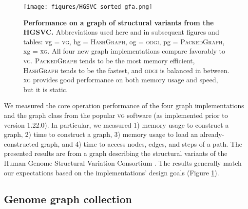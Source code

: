 \documentclass{bioinfo}
\begin{document}
\begin{figure}
	\begin{center}
		\texttt{[image: figures/HGSVC\_sorted\_gfa.png]}
	\end{center}
	\caption{{\label{fig:hgsvc}
        \textbf{Performance on a graph of structural variants from the HGSVC.}
        Abbreviations used here and in subsequent figures and tables: vg = \textsc{vg}, hg = \textsc{HashGraph}, og = \textsc{odgi}, pg = \textsc{PackedGraph}, xg = \textsc{xg}.
        All four new graph implementations compare favorably to \textsc{vg}.
        \textsc{PackedGraph} tends to be the most memory efficient, \textsc{HashGraph} tends to be the fastest, and \textsc{odgi} is balanced in between.
        \textsc{xg} provides good performance on both memory usage and speed, but it is static.
        }
      }
\end{figure}

We measured the core operation performance of the four graph implementations and the graph class from the popular \textsc{vg} software (as implemented prior to version 1.22.0).
In particular, we measured 1) memory usage to construct a graph, 2) time to construct a graph, 3) memory usage to load an already-constructed graph, and 4) time to access nodes, edges, and steps of a path.
The presented results are from a graph describing the structural variants of the Human Genome Structural Variation Consortium \citep{chaisson2019multi}.
The results generally match our expectations based on the implementations' design goals (Figure \ref{fig:hgsvc}).

\subsection{Genome graph collection}
\end{document}
